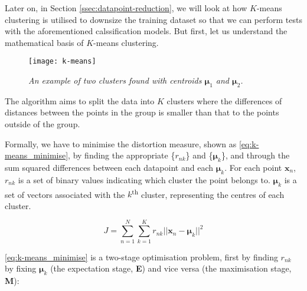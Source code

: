 Later on, in Section \ref{ssec:datapoint-reduction}, we will look at how $K$-means clustering is utilised to downsize the training dataset so that we can perform tests with the aforementioned calssification models. But first, let us understand the mathematical basis of $K$-means clustering.

\begin{figure}[H]
  \centering
  \texttt{[image: k-means]}
  \caption{\textit{An example of two clusters found with centroids $\mathbf{\mu}_1$ and $\mathbf{\mu}_2$.}}
  \label{fig:k-means}
\end{figure}

The algorithm aims to split the data into $K$ clusters where the differences of distances between the points in the group is smaller than that to the points outside of the group. 

Formally, we have to minimise the distortion measure, shown as \autoref{eq:k-means_minimise}, by finding the appropriate \{$r_{nk}$\} and \{$\mathbf{\mu}_k$\}, and through the sum squared differences between each datapoint and each $\mathbf{\mu}_k$. For each point $\mathbf{x}_n$, $r_{nk}$ is a set of binary values indicating which cluster the point belongs to. $\mathbf{\mu}_k$ is a set of vectors associated with the $k$\textsuperscript{th} cluster, representing the centres of each cluster. 

\begin{equation} \label{eq:k-means_minimise}
  J = \sum_{n=1}^{N} \sum_{k=1}^{K} r_{nk}||\mathbf{x}_n - \mathbf{\mu}_k||^2
\end{equation}

\autoref{eq:k-means_minimise} is a two-stage optimisation problem, first by finding $r_{nk}$ by fixing $\mathbf{\mu}_k$ (the expectation stage, \textbf{E}) and vice versa (the maximisation stage, \textbf{M}):

